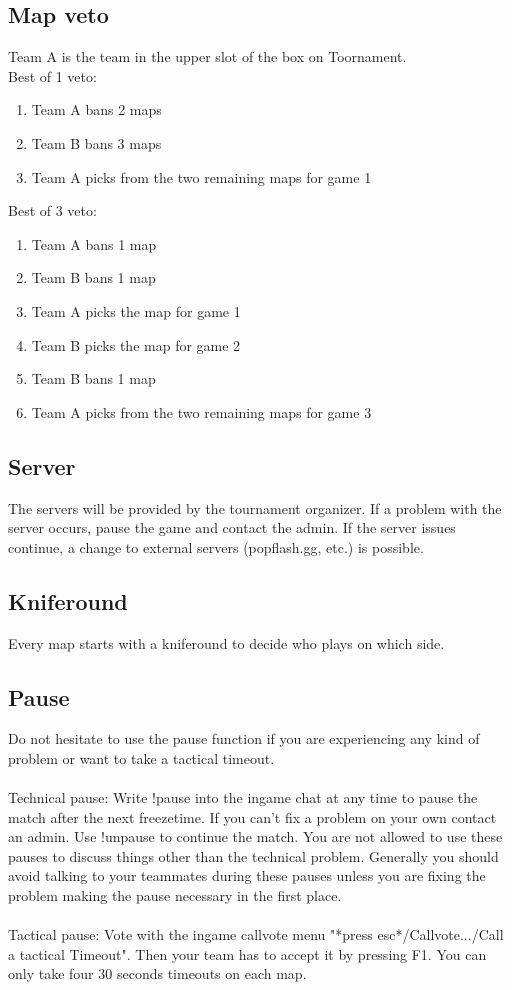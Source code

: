 \documentclass{article}
\begin{document}
\subsection{Map veto}
Team A is the team in the upper slot of the box on Toornament.\\
Best of 1 veto:
\begin{enumerate}
\item Team A bans 2 maps
\item Team B bans 3 maps
\item Team A picks from the two remaining maps for game 1
\end{enumerate}
Best of 3 veto:
\begin{enumerate}
\item Team A bans 1 map
\item Team B bans 1 map
\item Team A picks the map for game 1
\item Team B picks the map for game 2
\item Team B bans 1 map
\item Team A picks from the two remaining maps for game 3
\end{enumerate}



\subsection{Server}
The servers will be provided by the tournament organizer. If a problem with the server occurs, pause the game and contact the admin. If the server issues continue, a change to external servers (popflash.gg, etc.) is possible.

\subsection{Kniferound}
Every map starts with a kniferound to decide who plays on which side.

\subsection{Pause}
Do not hesitate to use the pause function if you are experiencing any kind of problem or want to take a tactical timeout. \\
\\Technical pause: Write {\selectfont 
!pause}  into the ingame chat at any time to pause the match after the next freezetime. If you can't fix a problem on your own contact an admin. Use {\selectfont 
!unpause} to continue the match. You are not allowed to use these pauses to discuss things other than the technical problem. Generally you should avoid talking to your teammates during these pauses unless you are fixing the problem making the pause necessary in the first place.\\
\\Tactical pause: Vote with the ingame callvote menu "*press esc*/Callvote.../Call a tactical Timeout". Then your team has to accept it by pressing F1. You can only take four 30 seconds timeouts on each map.
\end{document}

